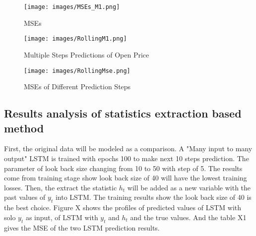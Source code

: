 \begin{wrapfigure}
  \vspace{5pt}
  \begin{center}
\texttt{[image: images/MSEs\_M1.png]}
  \end{center}
  \vspace{-20pt}
  \caption{\footnotesize MSEs}
\label{MseM1}
  \vspace{20pt}
\end{wrapfigure}

\begin{wrapfigure}
  \vspace{5pt}
  \begin{center}
\texttt{[image: images/RollingM1.png]}
  \end{center}
  \vspace{-20pt}
  \caption{\footnotesize Multiple Steps Predictions of Open Price}
\label{Rolling}
  \vspace{20pt}
\end{wrapfigure}

\begin{wrapfigure}
  \vspace{5pt}
  \begin{center}
\texttt{[image: images/RollingMse.png]}
  \end{center}
  \vspace{-20pt}
  \caption{\footnotesize MSEs of Different Prediction Steps}
\label{RollingMse}
  \vspace{20pt}
\end{wrapfigure}


\subsection{Results analysis of statistics extraction based method}

First, the original data will be modeled as a comparison. A "Many input to many output" LSTM is trained with epochs 100 to make next 10 steps prediction. The parameter of look back size changing from 10 to 50 with step of 5. The results come from training stage show look back size of 40 will have the lowest training losses. Then, the extract the statistic $h_t$ will be added as a new variable with the past values of $y_t$ into LSTM. The training results show the look back size of 40 is the best choice. Figure X shows the  profiles of predicted values of LSTM with solo $y_t$ as input, of LSTM with $y_t$ and $h_t$ and the true values. And the table X1 gives the MSE of the two LSTM prediction results. 


